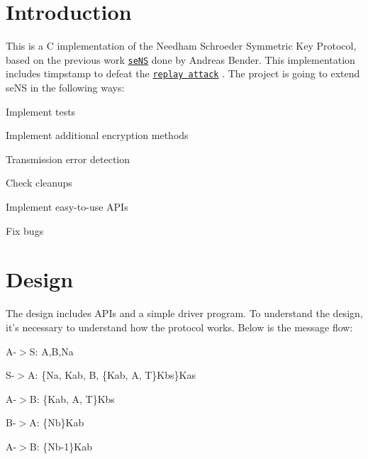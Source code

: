 \hypertarget{index_Introduction}{}\section{Introduction}\label{index_Introduction}
This is a C implementation of the Needham Schroeder Symmetric Key Protocol, based on the previous work \href{https://github.com/abender/needham-schroeder}{\tt se\-N\-S} done by Andreas Bender. This implementation includes timpstamp to defeat the \href{http://en.wikipedia.org/wiki/Needham-Schroeder_protocol}{\tt replay attack} . The project is going to extend se\-N\-S in the following ways\-:
\begin{DoxyItemize}
\item Implement tests
\item Implement additional encryption methods
\item Transmission error detection
\item Check cleanups
\item Implement easy-\/to-\/use A\-P\-Is
\item Fix bugs
\end{DoxyItemize}\hypertarget{index_Design}{}\section{Design}\label{index_Design}
The design includes A\-P\-Is and a simple driver program. To understand the design, it's necessary to understand how the protocol works. Below is the message flow\-:\par

\begin{DoxyItemize}
\item A-\/$>$S\-: A,B,Na\par

\item S-\/$>$A\-: \{Na, Kab, B, \{Kab, A, T\}Kbs\}Kas\par

\item A-\/$>$B\-: \{Kab, A, T\}Kbs\par

\item B-\/$>$A\-: \{Nb\}Kab\par

\item A-\/$>$B\-: \{Nb-\/1\}Kab
\end{DoxyItemize}

